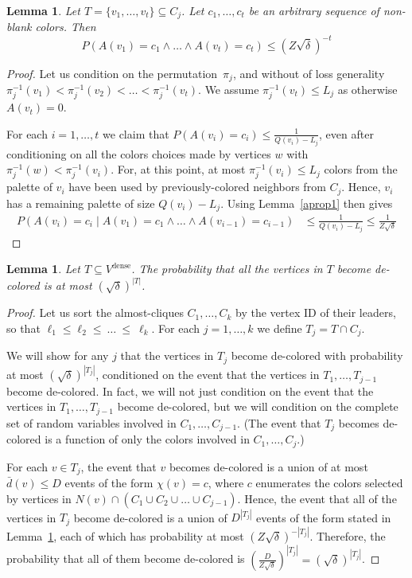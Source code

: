 \documentclass[11pt]{amsart}
\newtheorem{lemma}[theorem]{Lemma}
\begin{document}
\begin{lemma}
\label{color-lemma}
Let $T = \{v_1, \dots, v_t \} \subseteq C_j$. Let $c_1, \dots, c_t$ be an arbitrary sequence of non-blank colors. Then
$$
P( A(v_1) = c_1 \wedge \dots \wedge A(v_t) = c_t  ) \leq (Z \sqrt{\delta})^{-t}
$$
\end{lemma}
\begin{proof}
Let us condition on the permutation~$\pi_j$, and without of loss generality $\pi^{-1}_j(v_1) < \pi^{-1}_j(v_2) < \dots < \pi^{-1}_j (v_t)$. We assume $\pi^{-1}_j(v_t) \leq L_j$ as otherwise $A(v_t) = 0$.

For each $i = 1, \dots, t$ we claim that $P(A(v_i) = c_i) \leq \frac{1}{Q(v_i) - L_j}$, even after conditioning on all the colors choices made by vertices $w$ with $\pi^{-1}_j(w) < \pi_j^{-1}(v_i)$. For, at this point, at most $\pi^{-1}_j(v_i) \leq L_j$ colors from the palette of $v_i$ have been used by previously-colored neighbors from $C_j$. Hence, $v_i$ has a remaining palette of size $Q(v_i) - L_j$. Using Lemma~\ref{aprop1} then gives
\begin{align*}
P(A(v_i) = c_i \mid A(v_1) = c_1 \wedge \dots \wedge A(v_{i-1}) = c_{i-1}) &\leq \frac{1}{Q(v_i) - L_j}  \leq \frac{1}{Z \sqrt{\delta}}
\end{align*}
\end{proof}

\begin{lemma}
\label{prop1}
Let $T \subseteq V^{\text{dense}}$. The probability that all the vertices in $T$ become de-colored is at most $(\sqrt{\delta})^{|T|}$.
\end{lemma}
\begin{proof}
Let us sort the almost-cliques $C_1, \dots, C_k$ by the vertex ID of their leaders, so that $\ell_1\leq\ell_2\leq~\dots~\leq~\ell_k$. For each $j= 1, \dots, k$ we define $T_j = T \cap C_j$. 

We will show for any $j$ that the vertices in $T_j$ become de-colored with probability at most $(\sqrt{\delta})^{|T_j|}$, conditioned on the event that the vertices in $T_1, \dots, T_{j-1}$ become de-colored.  In fact, we will not just condition on the event that the vertices in $T_1, \dots, T_{j-1}$ become de-colored, but we will condition on the complete set of random variables involved in $C_1, \dots, C_{j-1}$. (The event that $T_j$ becomes de-colored is a function of only the colors involved in $C_1, \dots, C_j$.)

For each $v \in T_j$, the event that $v$ becomes de-colored is a union of at most ${\bar d}(v) \leq D$ events of the form $\chi(v) = c$, where $c$ enumerates the colors selected by vertices in $N(v) \cap (C_1 \cup C_2 \cup \dots \cup C_{j-1})$. Hence, the event that all of the vertices in $T_j$ become de-colored is a union of $D^{|T_j|}$ events of the form stated in Lemma~\ref{color-lemma}, each of which has probability at most $(Z \sqrt{\delta})^{-|T_j|}$. Therefore, the probability that all of them become de-colored is $(\frac{D}{Z \sqrt{\delta}})^{|T_j|} = (\sqrt{\delta})^{|T_j|}$.
\end{proof}
\end{document}

